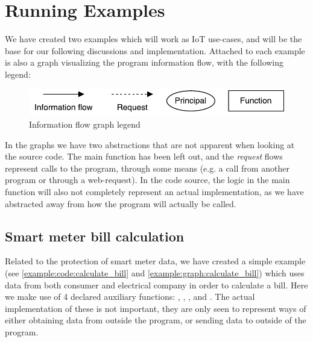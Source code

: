 
\section{Running Examples}\label{examples:sec}
We have created two examples which will work as IoT use-cases, and will be the base for our following discussions and implementation.
Attached to each example is also a graph visualizing the program information flow, with the following legend:
\begin{figure}[H]
  \centering
  \includegraphics[scale=0.8]{figures/dlm_legend}
  \caption{Information flow graph legend}
  \label{example:legend}
\end{figure}
In the graphs we have two abstractions that are not apparent when looking at the source code.
The main function has been left out, and the \emph{request} flows represent calls to the program, through some means (e.g. a call from another program or through a web-request).
In the code source, the logic in the main function will also not completely represent an actual implementation, as we have abstracted away from how the program will actually be called.

\subsection{Smart meter bill calculation}
Related to the protection of smart meter data, we have created a simple example (see \cref{example:code:calculate_bill} and \cref{example:graph:calculate_bill}) which uses data from both consumer and electrical company in order to calculate a bill.
Here we make use of 4 declared auxiliary functions: , , , and .
The actual implementation of these is not important, they are only seen to represent ways of either obtaining data from outside the program, or sending data to outside of the program.

